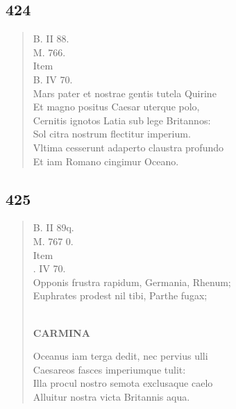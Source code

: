 \documentclass[11pt, a4paper]{report}
\begin{document}
            \subsection*{424}
      \begin{verse}
      B. II 88. \\ M. 766. \\  \lbrack Item \rbrack  \\ B. IV 70. \\ Mars pater et nostrae gentis tutela Quirine \\ Et magno positus Caesar uterque polo, \\ Cernitis ignotos Latia sub lege Britannos: \\ Sol citra nostrum flectitur imperium. \\ Vltima cesserunt adaperto claustra profundo \\ Et iam Romano cingimur Oceano. \\ 
      \end{verse}
  
            \subsection*{425}
      \begin{verse}
      B. II 89q. \\ M. 767 0. \\  \lbrack Item \rbrack  \\ . IV 70. \\ Opponis frustra rapidum, Germania, Rhenum; \\ Euphrates prodest nil tibi, Parthe fugax; \\ 
        ﻿\pagebreak 
    \begin{center} \textbf{CARMINA} \end{center} \marginpar{[326]} Oceanus iam terga dedit, nec pervius ulli \\ Caesareos fasces imperiumque tulit: \\ Illa procul nostro semota exclusaque caelo \\ Alluitur nostra victa Britannis aqua. \\ 
      \end{verse}
  
\end{document}
